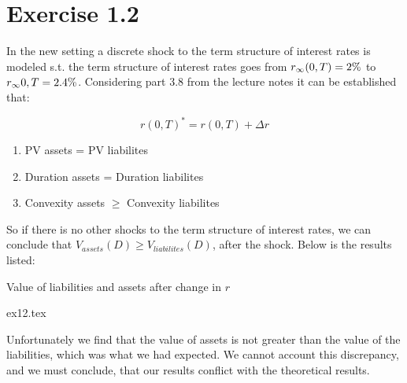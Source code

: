 \section{Exercise 1.2}

In the new setting a discrete  shock to the term structure of interest rates is modeled s.t. the term structure of interest rates goes from $r_{\infty}(0,T) = 2 \%$ to $r_{\infty}{0,T}=2.4 \%$. Considering part 3.8 from the lecture notes it can be established that:

\begin{equation}
	r(0,T)^{*} = r(0,T) + \Delta r
\end{equation}

\begin{enumerate}
	\item PV assets = PV liabilites
	\item Duration assets = Duration liabilites
	\item Convexity assets $\geq$ Convexity liabilites
\end{enumerate}

So if there is no other shocks to the term structure of interest rates, we can conclude that $V_{assets}(D) \geq V_{liabilites}(D)$, after the shock. Below is the results listed:

\begin{table}
\centering
\caption{Value of liabilities and assets after change in $r$}
\label{tab:ex12}
{ex12.tex}
\end{table}

Unfortunately we find that the value of assets is not greater than the value of the liabilities, which was what we had expected. We cannot account this discrepancy, and we must conclude, that our results conflict with the theoretical results.